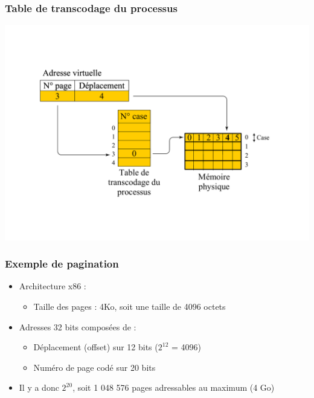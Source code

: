 \begin{frame}
\frametitle{Table de transcodage du processus}
\includegraphics[width=\textwidth]{../illustration/memoire_paginee_tab_transcodage.pdf}
\end{frame}


\begin{frame}
\frametitle{Exemple de pagination}
\begin{itemize}
\item Architecture x86 :
\begin{itemize}
\item Taille des pages :
4Ko, soit une taille de 4096 octets
\end{itemize}
\item Adresses 32 bits composées de :
\begin{itemize}
\item Déplacement (offset) sur 12 bits ($2^{12}$ = 4096)
\item Numéro de page codé sur 20 bits
\end{itemize}
\item Il y a donc $2^{20}$, soit 1 048 576 pages adressables au maximum (4 Go)
\end{itemize}
\end{frame}

